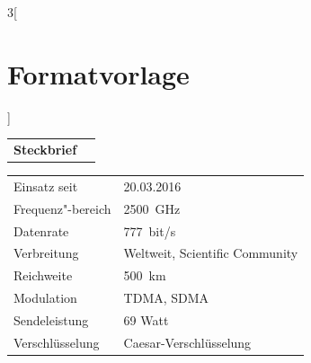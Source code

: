 \begin{multicols}{3}[\section{Formatvorlage}]


\newrefsegment

\begin{tabular}{p{}p{2.7 cm}}
\textbf{Steckbrief}& \\
\end{tabular}
\begin{tabular}{p{}p{2.7 cm}}
      Einsatz seit & 20.03.2016\\
      Frequenz"-bereich  & \SI{2500}{\giga\hertz}\\
      Datenrate & \SI{777}{bit/s}\\
      Verbreitung & Weltweit, Scientific Community\\
      Reichweite & \SI{500}{\kilo\metre}\\
      Modulation & TDMA, SDMA\\
      Sendeleistung & 69 Watt\\
      Verschlüsselung & Caesar-Verschlüsselung\\
\end{tabular}
\par

\end{multicols}
